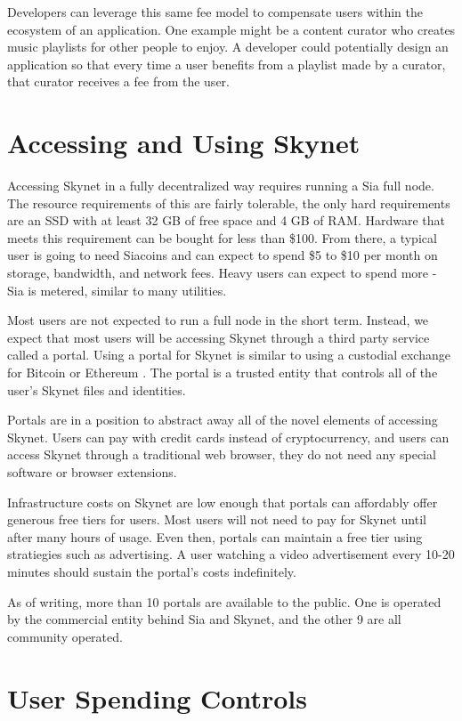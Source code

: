 \documentclass[twocolumn]{article}
\begin{document}
Developers can leverage this same fee model to compensate users within the
ecosystem of an application. One example might be a content curator who creates
music playlists for other people to enjoy. A developer could potentially design
an application so that every time a user benefits from a playlist made by a
curator, that curator receives a fee from the user.

\section{Accessing and Using Skynet}
Accessing Skynet in a fully decentralized way requires running a Sia full node.
The resource requirements of this are fairly tolerable, the only hard
requirements are an SSD with at least 32 GB of free space and 4 GB of RAM.
Hardware that meets this requirement can be bought for less than \$100. From
there, a typical user is going to need Siacoins and can expect to spend \$5 to
\$10 per month on storage, bandwidth, and network fees. Heavy users can expect
to spend more - Sia is metered, similar to many utilities.

Most users are not expected to run a full node in the short term. Instead, we
expect that most users will be accessing Skynet through a third party service
called a portal. Using a portal for Skynet is similar to using a custodial
exchange for Bitcoin \cite{bitcoin} or Ethereum \cite{ethereum}. The portal is a
trusted entity that controls all of the user's Skynet files and identities.

Portals are in a position to abstract away all of the novel elements of
accessing Skynet. Users can pay with credit cards instead of cryptocurrency, and
users can access Skynet through a traditional web browser, they do not need any
special software or browser extensions.

Infrastructure costs on Skynet are low enough that portals can affordably offer
generous free tiers for users. Most users will not need to pay for Skynet until
after many hours of usage. Even then, portals can maintain a free tier using
stratiegies such as advertising. A user watching a video advertisement every
10-20 minutes should sustain the portal's costs indefinitely.

As of writing, more than 10 portals are available to the public. One is operated
by the commercial entity behind Sia and Skynet, and the other 9 are all
community operated.

\section{User Spending Controls}
\end{document}
